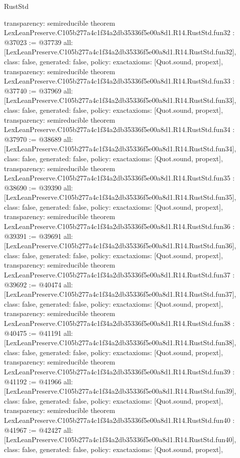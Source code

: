 \begin{lexlean}{RustStd}
\begin{coremodule}
{  transparency: semireducible
}
theorem LexLeanPreserve.C105b277a4c1f34a2db35336f5e00a8d1.R14.RustStd.fun32 : @37023 := @37739 {
  all: [LexLeanPreserve.C105b277a4c1f34a2db35336f5e00a8d1.R14.RustStd.fun32],
  class: false,
  generated: false,
  policy: exact{axioms: [Quot.sound, propext]},
  transparency: semireducible
}
theorem LexLeanPreserve.C105b277a4c1f34a2db35336f5e00a8d1.R14.RustStd.fun33 : @37740 := @37969 {
  all: [LexLeanPreserve.C105b277a4c1f34a2db35336f5e00a8d1.R14.RustStd.fun33],
  class: false,
  generated: false,
  policy: exact{axioms: [Quot.sound, propext]},
  transparency: semireducible
}
theorem LexLeanPreserve.C105b277a4c1f34a2db35336f5e00a8d1.R14.RustStd.fun34 : @37970 := @38689 {
  all: [LexLeanPreserve.C105b277a4c1f34a2db35336f5e00a8d1.R14.RustStd.fun34],
  class: false,
  generated: false,
  policy: exact{axioms: [Quot.sound, propext]},
  transparency: semireducible
}
theorem LexLeanPreserve.C105b277a4c1f34a2db35336f5e00a8d1.R14.RustStd.fun35 : @38690 := @39390 {
  all: [LexLeanPreserve.C105b277a4c1f34a2db35336f5e00a8d1.R14.RustStd.fun35],
  class: false,
  generated: false,
  policy: exact{axioms: [Quot.sound, propext]},
  transparency: semireducible
}
theorem LexLeanPreserve.C105b277a4c1f34a2db35336f5e00a8d1.R14.RustStd.fun36 : @39391 := @39691 {
  all: [LexLeanPreserve.C105b277a4c1f34a2db35336f5e00a8d1.R14.RustStd.fun36],
  class: false,
  generated: false,
  policy: exact{axioms: [Quot.sound, propext]},
  transparency: semireducible
}
theorem LexLeanPreserve.C105b277a4c1f34a2db35336f5e00a8d1.R14.RustStd.fun37 : @39692 := @40474 {
  all: [LexLeanPreserve.C105b277a4c1f34a2db35336f5e00a8d1.R14.RustStd.fun37],
  class: false,
  generated: false,
  policy: exact{axioms: [Quot.sound, propext]},
  transparency: semireducible
}
theorem LexLeanPreserve.C105b277a4c1f34a2db35336f5e00a8d1.R14.RustStd.fun38 : @40475 := @41191 {
  all: [LexLeanPreserve.C105b277a4c1f34a2db35336f5e00a8d1.R14.RustStd.fun38],
  class: false,
  generated: false,
  policy: exact{axioms: [Quot.sound, propext]},
  transparency: semireducible
}
theorem LexLeanPreserve.C105b277a4c1f34a2db35336f5e00a8d1.R14.RustStd.fun39 : @41192 := @41966 {
  all: [LexLeanPreserve.C105b277a4c1f34a2db35336f5e00a8d1.R14.RustStd.fun39],
  class: false,
  generated: false,
  policy: exact{axioms: [Quot.sound, propext]},
  transparency: semireducible
}
theorem LexLeanPreserve.C105b277a4c1f34a2db35336f5e00a8d1.R14.RustStd.fun40 : @41967 := @42427 {
  all: [LexLeanPreserve.C105b277a4c1f34a2db35336f5e00a8d1.R14.RustStd.fun40],
  class: false,
  generated: false,
  policy: exact{axioms: [Quot.sound, propext]},
}
\end{coremodule}
\end{lexlean}
